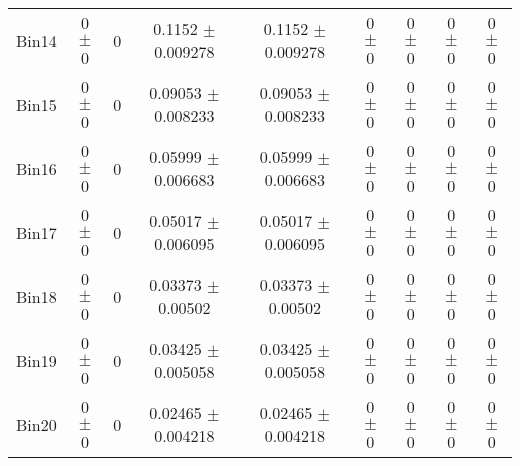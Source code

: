 \begin{tabular}{@{\extracolsep{4pt}}lcccccccc@{}}
     Bin14 & 0 $\pm$ 0 & 0 & 0.1152 $\pm$ 0.009278 & 0.1152 $\pm$ 0.009278 & 0 $\pm$ 0 & 0 $\pm$ 0 & 0 $\pm$ 0 & 0 $\pm$ 0 \\ 
     Bin15 & 0 $\pm$ 0 & 0 & 0.09053 $\pm$ 0.008233 & 0.09053 $\pm$ 0.008233 & 0 $\pm$ 0 & 0 $\pm$ 0 & 0 $\pm$ 0 & 0 $\pm$ 0 \\ 
     Bin16 & 0 $\pm$ 0 & 0 & 0.05999 $\pm$ 0.006683 & 0.05999 $\pm$ 0.006683 & 0 $\pm$ 0 & 0 $\pm$ 0 & 0 $\pm$ 0 & 0 $\pm$ 0 \\ 
     Bin17 & 0 $\pm$ 0 & 0 & 0.05017 $\pm$ 0.006095 & 0.05017 $\pm$ 0.006095 & 0 $\pm$ 0 & 0 $\pm$ 0 & 0 $\pm$ 0 & 0 $\pm$ 0 \\ 
     Bin18 & 0 $\pm$ 0 & 0 & 0.03373 $\pm$ 0.00502 & 0.03373 $\pm$ 0.00502 & 0 $\pm$ 0 & 0 $\pm$ 0 & 0 $\pm$ 0 & 0 $\pm$ 0 \\ 
     Bin19 & 0 $\pm$ 0 & 0 & 0.03425 $\pm$ 0.005058 & 0.03425 $\pm$ 0.005058 & 0 $\pm$ 0 & 0 $\pm$ 0 & 0 $\pm$ 0 & 0 $\pm$ 0 \\ 
     Bin20 & 0 $\pm$ 0 & 0 & 0.02465 $\pm$ 0.004218 & 0.02465 $\pm$ 0.004218 & 0 $\pm$ 0 & 0 $\pm$ 0 & 0 $\pm$ 0 & 0 $\pm$ 0 \\ 
\hline\hline
  \end{tabular}
